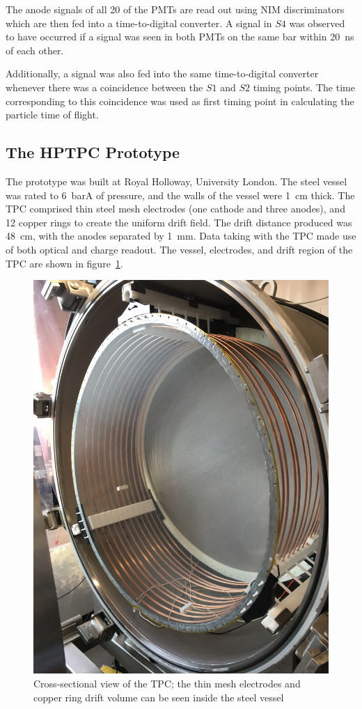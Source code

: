 The anode signals of all 20 of the PMTs are read out using NIM discriminators which are then fed into a time-to-digital converter. A signal in $S4$ was observed to have occurred if a signal was seen in both PMTs on the same bar within 20~ns of each other. 

Additionally, a signal was also fed into the same time-to-digital converter whenever there was a coincidence between the $S1$ and $S2$ timing points. The time corresponding to this coincidence was used as first timing point in calculating the particle time of flight.

\subsection{The HPTPC Prototype}
The prototype was built at Royal Holloway, University London.  The steel vessel was rated to 6~barA of pressure, and the walls of the vessel were 1~cm thick.
The TPC comprised thin steel mesh electrodes (one cathode and three anodes), and 12 copper rings to create the uniform drift field. The drift distance produced was 48~cm, with the anodes separated by 1~mm. Data taking with the TPC made use of both optical and charge readout. The vessel, electrodes, and drift region of the TPC are shown in figure~\ref{fig:TPC}.
    
     \begin{figure}
      \centering
    \includegraphics[width=0.6\linewidth]{files/Figures/IMG_1194.jpg}
    	\caption{Cross-sectional view of the TPC; the thin mesh electrodes and copper ring drift volume can be seen inside the steel vessel}
    		\label{fig:TPC}
    \end{figure}
    
